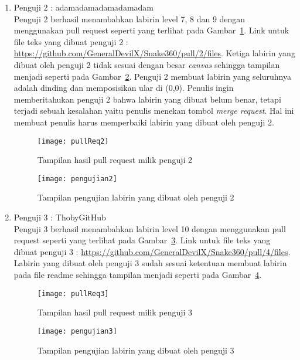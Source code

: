 \begin{enumerate}
	\item Penguji 2 : adamadamadamadamadam\\
	Penguji 2 berhasil menambahkan labirin level 7, 8 dan 9 dengan menggunakan pull request seperti yang terlihat pada Gambar~\ref{fig:pullReq2}. Link untuk file teks yang dibuat penguji 2 : \url{https://github.com/GeneralDevilX/Snake360/pull/2/files}. Ketiga labirin yang dibuat oleh penguji 2 tidak sesuai dengan besar \textit{canvas} sehingga tampilan menjadi seperti pada Gambar~\ref{fig:pengujian2}. Penguji 2 membuat labirin yang seluruhnya adalah dinding dan memposisikan ular di (0,0). Penulis ingin memberitahukan penguji 2 bahwa labirin yang dibuat belum benar, tetapi terjadi sebuah kesalahan yaitu penulis menekan tombol \textit{merge request}. Hal ini membuat penulis harus memperbaiki labirin yang dibuat oleh penguji 2.
	
	\begin{figure}[H]
		\centering  
		\texttt{[image: pullReq2]}  
		\caption[Tampilan hasil pull request milik penguji 2]{Tampilan hasil pull request milik penguji 2}
		\label{fig:pullReq2} 
	\end{figure}
	
	\begin{figure}[H]
		\centering  
		\texttt{[image: pengujian2]}  
		\caption[Tampilan pengujian labirin yang dibuat oleh penguji 2]{Tampilan pengujian labirin yang dibuat oleh penguji 2}
		\label{fig:pengujian2} 
	\end{figure}
	
	\item Penguji 3 : ThobyGitHub\\
	Penguji 3 berhasil menambahkan labirin level 10 dengan menggunakan pull request seperti yang terlihat pada Gambar~\ref{fig:pullReq3}. Link untuk file teks yang dibuat penguji 3 : \url{https://github.com/GeneralDevilX/Snake360/pull/4/files}. Labirin yang dibuat oleh penguji 3 sudah sesuai ketentuan membuat labirin pada file readme sehingga tampilan menjadi seperti pada Gambar~\ref{fig:pengujian3}.
	
	\begin{figure}[H]
		\centering  
		\texttt{[image: pullReq3]}  
		\caption[Tampilan hasil pull request milik penguji 3]{Tampilan hasil pull request milik penguji 3}
		\label{fig:pullReq3} 
	\end{figure}
	
	\begin{figure}[H]
		\centering  
		\texttt{[image: pengujian3]}  
		\caption[Tampilan pengujian labirin yang dibuat oleh penguji 3]{Tampilan pengujian labirin yang dibuat oleh penguji 3}
		\label{fig:pengujian3} 
	\end{figure}
	

\end{enumerate}
